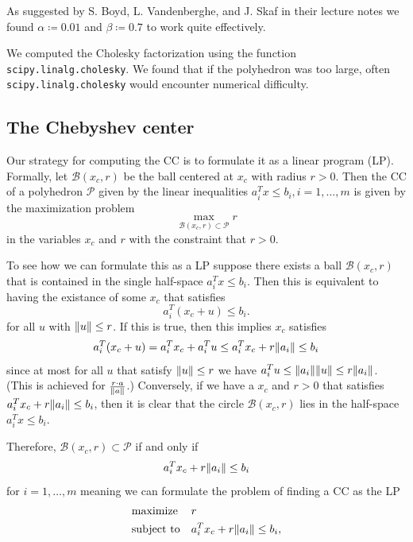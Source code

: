 \documentclass[11pt]{amsart}
\theoremstyle{definition}
\theoremstyle{remark}
\newcommand{\transpose}{T}
\begin{document}
        As suggested by S. Boyd, L. Vandenberghe, and J. Skaf in their lecture notes \cite[Section 2]{BVS08} we found $\alpha \coloneqq 0.01$ and $\beta \coloneqq 0.7$ to work quite effectively. 

        We computed the Cholesky factorization using the function \texttt{scipy.linalg.cholesky}. We found that if the polyhedron was too large, often \texttt{scipy.linalg.cholesky} would encounter numerical difficulty.

    \subsection{The Chebyshev center}\label{ss:computing_cc}
        Our strategy for computing the CC is to formulate it as a linear program (LP). Formally, let $\mathcal{B}(x_c, r)$ be the ball centered at $x_c$ with radius $r > 0$. Then the CC of a polyhedron $\mathcal{P}$ given by the linear inequalities $a_i^\transpose x \leq b_i, i = 1, \dots, m$ is given by the maximization problem
        \begin{equation*}
            \max_{\mathcal{B}(x_c, r) \subset \mathcal{P}} r
        \end{equation*}
        in the variables $x_c$ and $r$ with the constraint that $r > 0$. 

        To see how we can formulate this as a LP suppose there exists a ball $\mathcal{B}(x_c, r)$  that is contained in the single half-space $a_i^\transpose x \leq b_i$. Then this is equivalent to having the existance of some $x_c$ that satisfies
        \begin{equation*}
            a_i^\transpose (x_c + u) \leq b_i. 
        \end{equation*}
        for all $u$ with $\norm{u} \leq r$. If this is true, then this implies $x_c$ satisfies 
        \begin{align*}
            a_i^\transpose (x_c + u) = a_i^\transpose x_c + a_i^\transpose u \leq a_i^\transpose x_c + r\norm{a_i} \leq b_i 
        \end{align*}
        since at most for all $u$ that satisfy $\norm{u} \leq r$ we have $a_i^\transpose u \leq \norm{a_i}\norm{u} \leq r \norm{a_i}$. (This is achieved for $\frac{r\cdot a}{\norm{a}}$.) Conversely, if we have a $x_c$ and $r > 0$ that satisfies $a_i^\transpose x_c + r\norm{a_i} \leq b_i$, then it is clear that the circle $\mathcal{B}(x_c, r)$ lies in the half-space $a_i^\transpose x \leq b_i$. 

        Therefore, $\mathcal{B}(x_c, r) \subset \mathcal{P}$ if and only if 
        \begin{equation*}
            a_i^\transpose x_c + r\norm{a_i} \leq b_i
        \end{equation*}
        for $i = 1, \dots, m$ meaning we can formulate the problem of finding a CC as the LP
        \begin{equation}\label{e:cc}
            \begin{aligned}
            & \text{maximize} && r  \\
            & \text{subject to} && a_i^\transpose x_c + r\norm{a_i} \leq b_i, 
            \end{aligned}
        \end{equation}
\end{document}
